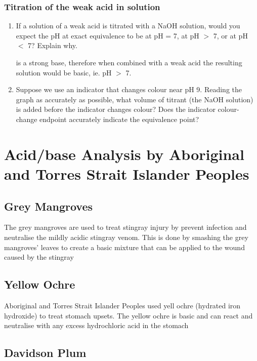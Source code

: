 		\subsubsection{Titration of the weak acid in solution}

			\begin{enumerate}
				\item If a solution of a weak acid is titrated with a NaOH solution, would you expect the pH at exact equivalence to be at pH = 7, at pH $>$ 7, or at pH $<$ 7? Explain why.
					
					 is a strong base, therefore when combined with a weak acid the resulting solution would be basic, ie. pH $>$ 7.

				\item Suppose we use an indicator that changes colour near pH 9. Reading the graph as accurately as possible, what volume of titrant (the NaOH solution) is added before the indicator changes colour? Does the indicator colour-change endpoint accurately indicate the equivalence point?
			\end{enumerate}


\section{Acid/base Analysis by Aboriginal and Torres Strait Islander Peoples} \label{20/03/2025}

	\subsection{Grey Mangroves}
	
		The grey mangroves are  used to treat stingray injury by prevent infection and neutralise the mildly acidic stingray venom. This is done by smashing the grey mangroves' leaves to create a basic mixture that can be applied to the wound caused by the stingray

	\subsection{Yellow Ochre}
	
		Aboriginal and Torres Strait Islander Peoples used yell ochre (hydrated iron hydroxide) to treat stomach upsets. The yellow ochre is basic and can react and neutralise with any excess hydrochloric acid in the stomach

	\subsection{Davidson Plum}
	
